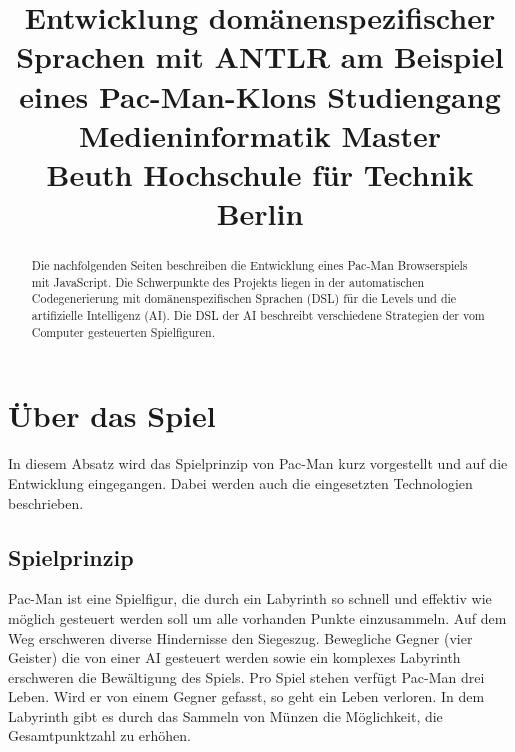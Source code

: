 \documentclass[conference]{IEEEtran}
\begin{document}
\title{%
  Entwicklung domänenspezifischer Sprachen mit ANTLR am Beispiel eines Pac-Man-Klons\bigbreak
  \large Studiengang Medieninformatik Master\\Beuth Hochschule für Technik Berlin}


\author{
\and
{}
\and
{}
}

\maketitle

\lstset{%
  basicstyle=\footnotesize\ttfamily
  }
\begin{abstract}
Die nachfolgenden Seiten beschreiben die Entwicklung eines Pac-Man Browserspiels mit JavaScript. Die Schwerpunkte des Projekts liegen in der automatischen Codegenerierung mit domänenspezifischen Sprachen (DSL) für die Levels und die artifizielle Intelligenz (AI). Die DSL der AI beschreibt verschiedene Strategien der vom  Computer gesteuerten Spielfiguren.
\end{abstract}

\IEEEpeerreviewmaketitle



\section{Über das Spiel}

In diesem Absatz wird das Spielprinzip von Pac-Man kurz vorgestellt und auf die Entwicklung eingegangen. Dabei werden auch die eingesetzten Technologien beschrieben.

\subsection{Spielprinzip}
Pac-Man ist eine Spielfigur, die durch ein Labyrinth so schnell und effektiv wie möglich gesteuert werden soll um alle vorhanden Punkte einzusammeln. Auf dem Weg erschweren diverse Hindernisse den Siegeszug. Bewegliche Gegner (vier Geister) die von einer AI gesteuert werden sowie ein komplexes Labyrinth erschweren die Bewältigung des Spiels. Pro Spiel stehen verfügt Pac-Man drei Leben. Wird er von einem Gegner gefasst, so geht ein Leben verloren. In dem Labyrinth gibt es durch das Sammeln von Münzen die Möglichkeit, die Gesamtpunktzahl zu erhöhen.
\end{document}
